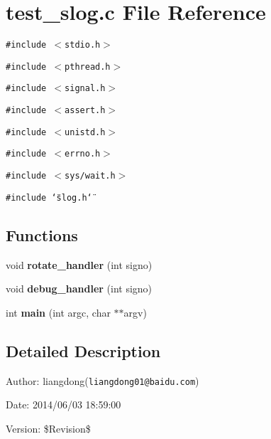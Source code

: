 \section{test\_\-slog.c File Reference}
\label{test__slog_8c}
{\tt \#include $<$stdio.h$>$}\par
{\tt \#include $<$pthread.h$>$}\par
{\tt \#include $<$signal.h$>$}\par
{\tt \#include $<$assert.h$>$}\par
{\tt \#include $<$unistd.h$>$}\par
{\tt \#include $<$errno.h$>$}\par
{\tt \#include $<$sys/wait.h$>$}\par
{\tt \#include \char`\"{}slog.h\char`\"{}}\par
\subsection*{Functions}
\begin{CompactItemize}
\item 
void {\bf rotate\_\-handler} (int signo)\label{test__slog_8c_a1}

\item 
void {\bf debug\_\-handler} (int signo)\label{test__slog_8c_a2}

\item 
int {\bf main} (int argc, char $\ast$$\ast$argv)\label{test__slog_8c_a3}

\end{CompactItemize}


\subsection{Detailed Description}
\begin{Desc}
\item[Author:]liangdong({\tt liangdong01@baidu.com}) \end{Desc}
\begin{Desc}
\item[Date:]2014/06/03 18:59:00 \end{Desc}
\begin{Desc}
\item[Version:]\$Revision\$ \end{Desc}
